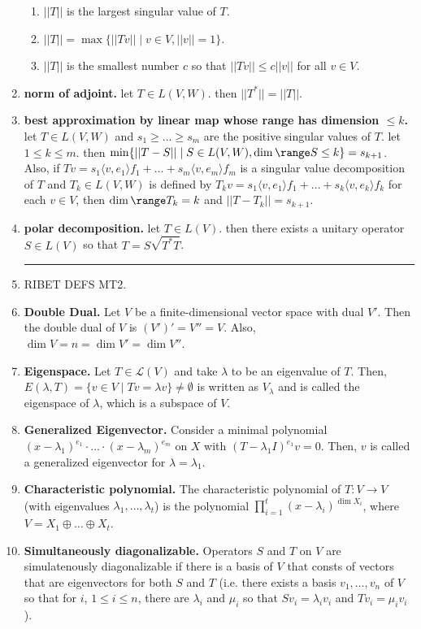 \begin{enumerate}
\begin{enumerate}
		\item $||T||$ is the largest singular value of $T$. 
		\item $||T|| = \max\{||Tv|| \mid v \in V, ||v||=1\}$. 
		\item $||T||$ is the smallest number $c$ so that $||Tv|| \leq c||v||$ for all $v \in V$. 
	\end{enumerate}
	\item \textbf{norm of adjoint. } let $T \in L(V,W)$. then $||T^*|| = ||T||$. 
	\item \textbf{best approximation by linear map whose range has dimension $\leq k$. } let $T \in L(V,W)$ and $s_1 \geq \dots \geq s_m$ are the positive singular values of $T$. let $1 \leq k \leq m$. then $\min\{||T-S|| \mid S \in L(V,W), \dim\range S \leq k\} = s_{k+1}$. Also, if $Tv = s_1 \langle v,e_1 \rangle f_1 + \dots + s_m \langle v,e_m \rangle f_m$ is a singular value decomposition of $T$ and $T_k \in L(V,W)$ is defined by $T_kv = s_1 \langle v,e_1 \rangle f_1 + \dots + s_k \langle v,e_k \rangle f_k$ for each $v \in V$, then $\dim\range T_k = k$ and $||T-T_k|| = s_{k+1}$. 
	\item \textbf{polar decomposition. } let $T \in L(V)$. then there exists a unitary operator $S \in L(V)$ so that $T = S\sqrt{T^*T}$. 
	\begin{center}
		\hrule
	\end{center}
	\item RIBET DEFS MT2.
	\item \textbf{Double Dual. } Let $V$ be a finite-dimensional vector space with dual $V'$. Then the double dual of $V$ is $(V')' = V'' = V$. Also, $\dim V = n = \dim V' = \dim V''$. 
	\item \textbf{Eigenspace. } Let $T \in \mathscr{L}(V)$ and take $\lambda$ to be an eigenvalue of $T$. Then, $E(\lambda,T) = \{v \in V \mid Tv = \lambda v\} \neq \emptyset$ is written as $V_\lambda$ and is called the eigenspace of $\lambda$, which is a subspace of $V$. 
	\item \textbf{Generalized Eigenvector. } Consider a minimal polynomial $(x-\lambda_1)^{e_1} \cdot \dots \cdot (x-\lambda_m)^{e_m}$ on $X$ with $(T-\lambda_1I)^{e_1}v = 0$. Then, $v$ is called a generalized eigenvector for $\lambda = \lambda_1$. 
	\item \textbf{Characteristic polynomial. } The characteristic polynomial of $T: V \to V$ (with eigenvalues $\lambda_1,\dots,\lambda_t$) is the polynomial $\prod_{i=1}^{t} (x-\lambda_i)^{\dim X_i}$, where $V = X_1 \oplus \dots \oplus X_t$. 
	\item \textbf{Simultaneously diagonalizable. } Operators $S$ and $T$ on $V$ are simulatenously diagonalizable if there is a basis of $V$ that consts of vectors that are eigenvectors for both $S$ and $T$ (i.e. there exists a basis $v_1,\dots,v_n$ of $V$ so that for $i$, $1 \leq i \leq n$, there are $\lambda_i$ and $\mu_i$ so that $Sv_i = \lambda_iv_i$ and $Tv_i = \mu_iv_i$). 

\end{enumerate}
